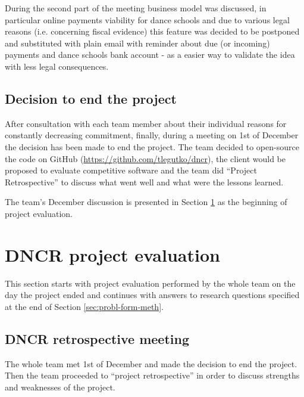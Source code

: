 \documentclass{article}
\begin{document}
During the second part of the meeting business model was discussed, in particular online payments viability for dance schools and due to various legal reasons (i.e. concerning fiscal evidence) this feature was decided to be postponed and substituted with plain email with reminder about due (or incoming) payments and dance schools bank account - as a easier way to validate the idea with less legal consequences.

\subsection{Decision to end the project}
After consultation with each team member about their individual reasons for constantly decreasing commitment, finally, during a meeting on 1st of December the decision has been made to end the project. The team decided to open-source the code on GitHub (\url{https://github.com/tlegutko/dncr}), the client would be proposed to evaluate competitive software and the team did ``Project Retrospective'' to discuss what went well and what were the lessons learned.

The team's December discussion is presented in Section \ref{sec:dncr-proj-eval} as the beginning of project evaluation.

\section{DNCR project evaluation}
\label{sec:dncr-proj-eval}
This section starts with project evaluation performed by the whole team on the day the project ended and continues with answers to research questions specified at the end of Section \ref{sec:probl-form-meth}.

\subsection{DNCR retrospective meeting}
The whole team met 1st of December and made the decision to end the project. Then the team proceeded to ``project retrospective'' in order to discuss strengths and weaknesses of the project.
\end{document}
